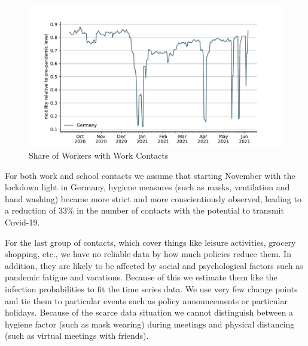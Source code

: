 \begin{figure}[ht]
    \centering
    \includegraphics[width=\textwidth]{figures/results/figures/data/work_multiplier_since_sep}
    \caption{Share of Workers with Work Contacts}
    \label{fig:work_multiplier}
\end{figure}

For both work and school contacts we assume that starting November with the lockdown
light in Germany, hygiene measures (such as masks, ventilation and hand washing) became
more strict and more conscientiously observed, leading to a reduction of 33\% in the
number of contacts with the potential to transmit Covid-19.

For the last group of contacts, which cover things like leisure activities, grocery
shopping, etc., we have no reliable data by how much policies reduce them. In addition,
they are likely to be affected by social and psychological factors such as pandemic
fatigue and vacations. Because of this we estimate them like the infection probabilities
to fit the time series data. We use very few change points and tie them to particular
events such as policy announcements or particular holidays. Because of the scarce data
situation we cannot distinguish between a hygiene factor (such as mask wearing) during
meetings and physical distancing (such as virtual meetings with
friends).


